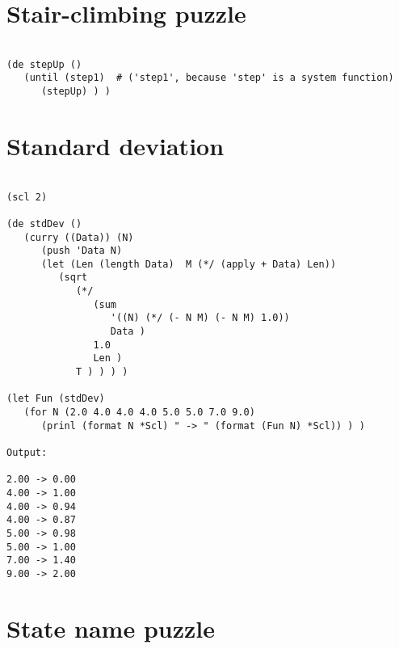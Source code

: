 \section*{Stair-climbing puzzle}

\begin{verbatim}

(de stepUp ()
   (until (step1)  # ('step1', because 'step' is a system function)
      (stepUp) ) )

\end{verbatim}

\section*{Standard deviation}

\begin{verbatim}

(scl 2)

(de stdDev ()
   (curry ((Data)) (N)
      (push 'Data N)
      (let (Len (length Data)  M (*/ (apply + Data) Len))
         (sqrt
            (*/
               (sum
                  '((N) (*/ (- N M) (- N M) 1.0))
                  Data )
               1.0
               Len )
            T ) ) ) )

(let Fun (stdDev)
   (for N (2.0 4.0 4.0 4.0 5.0 5.0 7.0 9.0)
      (prinl (format N *Scl) " -> " (format (Fun N) *Scl)) ) )

Output:

2.00 -> 0.00
4.00 -> 1.00
4.00 -> 0.94
4.00 -> 0.87
5.00 -> 0.98
5.00 -> 1.00
7.00 -> 1.40
9.00 -> 2.00

\end{verbatim}

\section*{State name puzzle}

